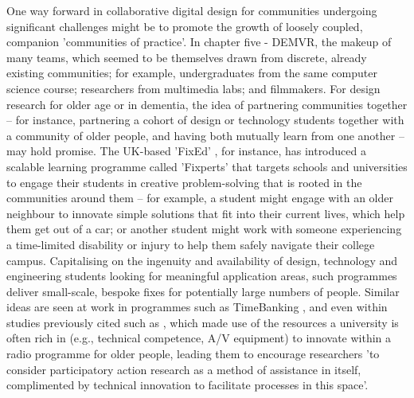 One way forward in collaborative digital design for communities undergoing significant challenges might be to promote the growth of loosely coupled, companion 'communities of practice'. In chapter five - DEMVR, the makeup of many teams, which seemed to be themselves drawn from discrete, already existing communities; for example, undergraduates from the same computer science course; researchers from multimedia labs; and filmmakers. For design research for older age or in dementia, the idea of partnering communities together – for instance, partnering a cohort of design or technology students together with a community of older people, and having both mutually learn from one another – may hold promise. The UK-based 'FixEd' \citep{noauthor_fixperts_nodate}, for instance, has introduced a scalable learning programme called 'Fixperts' that targets schools and universities to engage their students in creative problem-solving that is rooted in the communities around them – for example, a student might engage with an older neighbour to innovate simple solutions that fit into their current lives, which help them get out of a car; or another student might work with someone experiencing a time-limited disability or injury to help them safely navigate their college campus. Capitalising on the ingenuity and availability of design, technology and engineering students looking for meaningful application areas, such programmes deliver small-scale, bespoke fixes for potentially large numbers of people. Similar ideas are seen at work in programmes such as TimeBanking \citep{noauthor_hour_nodate}, and even within studies previously cited such as \cite{reuter_older_2019}, which made use of the resources a university is often rich in (e.g., technical competence, A/V equipment) to innovate within a radio programme for older people, leading them to encourage researchers 'to consider participatory action research as a method of assistance in itself, complimented by technical innovation to facilitate processes in this space'.

